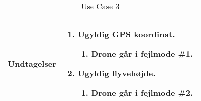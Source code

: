 \begin{table}[H]
\begin{tabular}{| p{3cm}| p{11.5cm}|}
Undtagelser							& 

									\renewcommand{\labelenumi}{\Roman{enumi}:}
									\renewcommand{\labelenumii}{\alph{enumii})}
									\begin{enumerate}[topsep=0.0cm,leftmargin=0.5cm]
										\item Ugyldig GPS koordinat.
											\begin{enumerate}[topsep=0cm, leftmargin=1cm]
												\item Drone går i fejlmode  \#1.
											\end{enumerate}
										\item Ugyldig flyvehøjde.
											\begin{enumerate}[topsep=0cm, leftmargin=1cm]
												\item Drone går i fejlmode \#2.
											\end{enumerate}
									\end{enumerate} \\\hline	

\end{tabular}
\caption{Use Case 3}
\label{tab:UC3}
\end{table}
